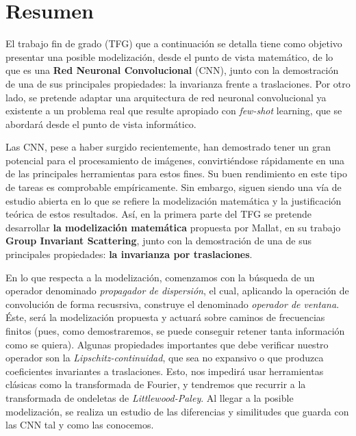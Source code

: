 %


\chapter{Resumen}

\noindent El trabajo fin de grado (TFG) que a continuación se detalla tiene como objetivo presentar una posible modelización, desde el punto de vista matemático, de lo que es una \textbf{Red Neuronal Convolucional} (CNN), junto con la demostración de una de sus principales propiedades: la invarianza frente a traslaciones. Por otro lado, se pretende adaptar una arquitectura de red neuronal convolucional ya existente a un problema real que resulte apropiado con \textit{few-shot} learning, que se abordará desde el punto de vista informático.

\medskip

\noindent Las CNN, pese a haber surgido recientemente, han demostrado tener un gran potencial para el procesamiento de imágenes, convirtiéndose rápidamente en una de las principales herramientas para estos fines. Su buen rendimiento en este tipo de tareas es comprobable empíricamente. Sin embargo, siguen siendo una vía de estudio abierta en lo que se refiere la modelización matemática y la justificación teórica de estos resultados. Así, en la primera parte del TFG se pretende desarrollar \textbf{la modelización matemática} propuesta por Mallat, en su trabajo \textbf{Group Invariant Scattering}, junto con la demostración de una de sus principales propiedades: \textbf{la invarianza por traslaciones}.

\medskip

\noindent En lo que respecta a la modelización, comenzamos con la búsqueda de un operador denominado \textit{propagador de dispersión}, el cual,  aplicando la operación de convolución de forma recusrsiva, construye el denominado \textit{operador de ventana}. Éste, será la modelización propuesta y actuará sobre caminos de frecuencias finitos (pues, como demostraremos, se puede conseguir retener tanta información como se quiera). Algunas propiedades importantes que debe verificar nuestro operador son la \textit{Lipschitz-continuidad}, que sea no expansivo o que produzca coeficientes invariantes a traslaciones. Esto, nos impedirá usar herramientas clásicas como la transformada de Fourier, y tendremos que recurrir a la transformada de ondeletas de \textit{Littlewood-Paley}. Al llegar a la posible modelización, se realiza un estudio de las diferencias y similitudes que guarda con las CNN tal y como las conocemos.

